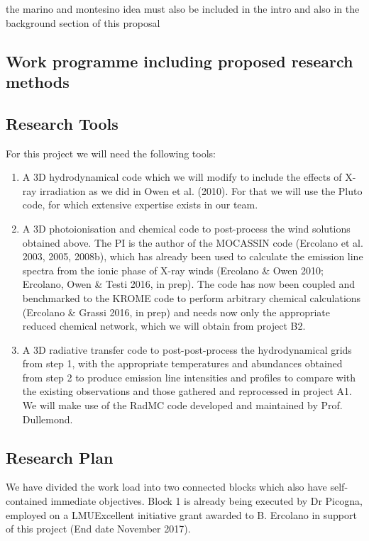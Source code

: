 \documentclass[10pt,fleqn,twoside]{article}
\newcommand{\Tcol}{\color{blue}}
\begin{document}
{\color{red} the marino and montesino idea must also be included in
  the intro and also in the background section of this proposal}

\subsection{\Tcol Work programme including proposed research methods}

\subsection{Research Tools}

For this project we will need the following tools: 
\begin{enumerate}
\item A 3D hydrodynamical code which we will modify to include the
  effects of X-ray irradiation as we did in Owen et al. (2010). For
  that we will use the Pluto code, for which extensive expertise
  exists in our team. 
\item A 3D photoionisation and chemical code to post-process the wind solutions obtained above. The PI is the author of the MOCASSIN code (Ercolano et al. 2003, 2005, 2008b), which has already been used to calculate the emission line spectra from the ionic phase of X-ray winds (Ercolano \& Owen 2010; Ercolano, Owen \& Testi 2016, in prep). The code has now been coupled and benchmarked to the KROME code to perform arbitrary chemical calculations (Ercolano \& Grassi 2016, in prep)  and needs now only the appropriate reduced chemical network, which we will obtain from project B2. 
\item A 3D radiative transfer code to post-post-process the hydrodynamical grids from step 1, with the appropriate temperatures and abundances obtained from step 2 to produce emission line intensities and profiles to compare with the existing observations and those gathered and reprocessed in project A1. We will make use of the RadMC code developed and maintained by Prof. Dullemond.  
\end{enumerate}

\subsection{Research Plan} 

We have divided the work load into two connected blocks which
also have self-contained immediate objectives. Block 1 is already
being executed by Dr Picogna, employed on a LMUExcellent initiative
grant awarded to B. Ercolano in support of this project (End date
November 2017). 
\end{document}

